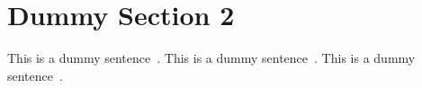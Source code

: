 \section{Dummy Section 2}
\label{appendix:dummy2}

This is a dummy sentence~\cite{Alpher02}. This is a dummy sentence~\cite{Alpher03}. This is a dummy sentence~\cite{Alpher04}.

